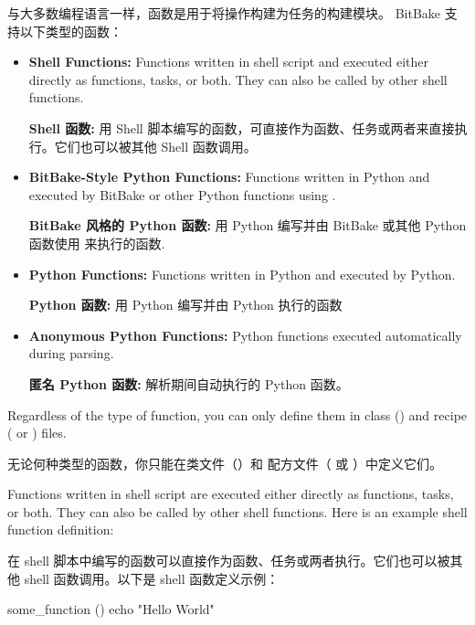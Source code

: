 与大多数编程语言一样，函数是用于将操作构建为任务的构建模块。 BitBake 支持以下类型的函数：

\begin{itemize}
\setlength\itemsep{1.0em}
\item \textbf{Shell Functions:} Functions written in shell script and executed either directly as functions, tasks, or both. They can also be called by other shell functions.

\medskip
\textbf{Shell 函数:} 用 Shell 脚本编写的函数，可直接作为函数、任务或两者来直接执行。它们也可以被其他 Shell 函数调用。

\item \textbf{BitBake-Style Python Functions:} Functions written in Python and executed by BitBake or other Python functions using .

\medskip
\textbf{BitBake 风格的 Python 函数:} 用 Python 编写并由 BitBake 或其他 Python 函数使用  来执行的函数.

\item \textbf{Python Functions:} Functions written in Python and executed by Python.

\medskip
\textbf{Python 函数:} 用 Python 编写并由 Python 执行的函数

\item \textbf{Anonymous Python Functions:} Python functions executed automatically during parsing.

\medskip
\textbf{匿名 Python 函数:} 解析期间自动执行的 Python 函数。
\end{itemize}

Regardless of the type of function, you can only define them in class () and recipe ( or ) files.


无论何种类型的函数，你只能在类文件（）和 配方文件（ 或 ）中定义它们。


\label{section:Shell Functions}

Functions written in shell script are executed either directly as functions, tasks, or both. They can also be called by other shell functions. Here is an example shell function definition:

在 shell 脚本中编写的函数可以直接作为函数、任务或两者执行。它们也可以被其他 shell 函数调用。以下是 shell 函数定义示例：

\begin{pyglist}
some_function () {
    echo "Hello World"
}
\end{pyglist}

